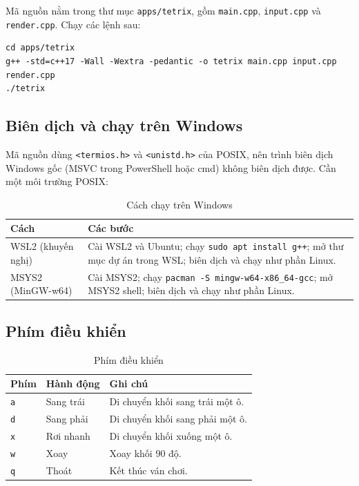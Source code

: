 \documentclass[12pt,a4paper]{article}
\begin{document}
Mã nguồn nằm trong thư mục \texttt{apps/tetrix}, gồm \texttt{main.cpp},
\texttt{input.cpp} và \texttt{render.cpp}. Chạy các lệnh sau:

\begin{verbatim}
cd apps/tetrix
g++ -std=c++17 -Wall -Wextra -pedantic -o tetrix main.cpp input.cpp render.cpp
./tetrix
\end{verbatim}

\subsection{Biên dịch và chạy trên Windows}

Mã nguồn dùng \texttt{<termios.h>} và \texttt{<unistd.h>} của POSIX, nên trình
biên dịch Windows gốc (MSVC trong PowerShell hoặc cmd) không biên dịch được.
Cần một môi trường POSIX:

\begin{table}[H]
  \centering
  \small
  \caption{Cách chạy trên Windows}
  \begin{tabularx}{\textwidth}{P{3.4cm} Y}
    \toprule
    \textbf{Cách} & \textbf{Các bước} \\
    \midrule
    WSL2 (khuyến nghị) & Cài WSL2 và Ubuntu; chạy \texttt{sudo apt install g++}; mở thư mục dự án trong WSL; biên dịch và chạy như phần Linux. \\
    MSYS2 (MinGW-w64) & Cài MSYS2; chạy \texttt{pacman -S mingw-w64-x86\_64-gcc}; mở MSYS2 shell; biên dịch và chạy như phần Linux. \\
    \bottomrule
  \end{tabularx}
\end{table}

\subsection{Phím điều khiển}

\begin{table}[H]
  \centering
  \small
  \caption{Phím điều khiển}
  \begin{tabular}{lll}
    \toprule
    \textbf{Phím} & \textbf{Hành động} & \textbf{Ghi chú} \\
    \midrule
    \texttt{a} & Sang trái & Di chuyển khối sang trái một ô. \\
    \texttt{d} & Sang phải & Di chuyển khối sang phải một ô. \\
    \texttt{x} & Rơi nhanh & Di chuyển khối xuống một ô. \\
    \texttt{w} & Xoay & Xoay khối 90 độ. \\
    \texttt{q} & Thoát & Kết thúc ván chơi. \\
    \bottomrule
  \end{tabular}
\end{table}
\end{document}
